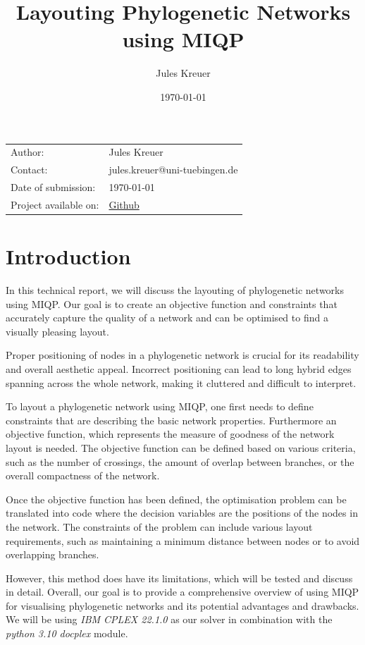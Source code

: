 \documentclass{article}
\title{Layouting Phylogenetic Networks using MIQP}
\author{Jules Kreuer}
\date{\today}
\begin{document}
\maketitle
\noindent\begin{tabular}{ll}
Author: & Jules Kreuer\\
Contact: & jules.kreuer@uni-tuebingen.de\\
Date of submission: & \today\\
Project available on: & \href{https://github.com/not-a-feature/Layouting-Phylogenetic-Networks-using-MIQP}{Github}
\end{tabular}
\section*{Introduction}
In this technical report, we will discuss the layouting of phylogenetic networks using \ac{MIQP}. Our goal is to create an objective function and constraints that accurately capture the quality of a network and can be optimised to find a visually pleasing layout.  

Proper positioning of nodes in a phylogenetic network is crucial for its readability and overall aesthetic appeal. Incorrect positioning can lead to long hybrid edges spanning across the whole network, making it cluttered and difficult to interpret. 

To layout a phylogenetic network using \ac{MIQP}, one first needs to define constraints that are describing the basic network properties. Furthermore an objective function, which represents the measure of goodness of the network layout is needed. The objective function can be defined based on various criteria, such as the number of crossings, the amount of overlap between branches, or the overall compactness of the network.

Once the objective function has been defined, the optimisation problem can be translated into code where the decision variables are the positions of the nodes in the network. The constraints of the problem can include various layout requirements, such as maintaining a minimum distance between nodes or to avoid overlapping branches.

However, this method does have its limitations, which will be tested and discuss in detail. Overall, our goal is to provide a comprehensive overview of using \ac{MIQP} for visualising phylogenetic networks and its potential advantages and drawbacks.
We will be using \textit{IBM CPLEX 22.1.0} as our solver in combination with the \textit{python 3.10 docplex} module.
\end{document}
